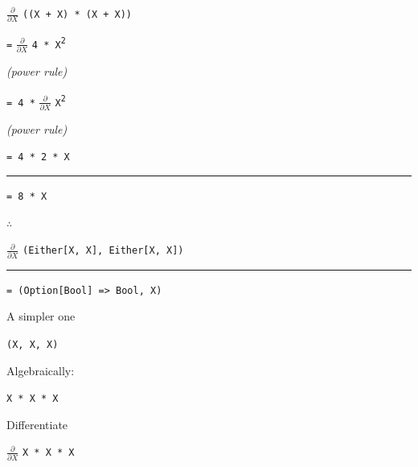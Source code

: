 \begin{frame}
\begin{center}
$\frac{\partial}{\partial X}$ \lstinline{((X + X) * (X + X))}

\lstinline{=} $\frac{\partial}{\partial X}$ \lstinline{4 * X}\textsuperscript{\lstinline{2}}

\tiny{\emph{(power rule)}}\normalsize{}

\lstinline{= 4 *} $\frac{\partial}{\partial X}$ \lstinline{X}\textsuperscript{\lstinline{2}}

\tiny{\emph{(power rule)}}\normalsize{}

\lstinline{= 4 * 2 * X}

\par\noindent\rule{\textwidth}{0.4pt}

\lstinline{= 8 * X}
\end{center}
\end{frame}


\begin{frame}
\begin{block}{$\therefore$}
\begin{center}
$\frac{\partial}{\partial X}$ \lstinline{(Either[X, X], Either[X, X])}

\par\noindent\rule{\textwidth}{0.4pt}

\lstinline{= (Option[Bool] => Bool, X)}
\end{center}
\end{block}
\end{frame}


\begin{frame}
\begin{center}
A simpler one

\lstinline{(X, X, X)}
\end{center}
\end{frame}


\begin{frame}
\begin{center}
Algebraically:

\lstinline{X * X * X}
\end{center}
\end{frame}


\begin{frame}
\begin{center}
Differentiate

$\frac{\partial}{\partial X}$ \lstinline{X * X * X}
\end{center}
\end{frame}


